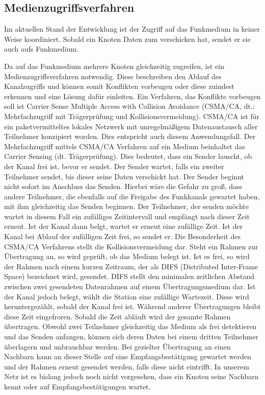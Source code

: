 \documentclass{IEEEtran}
\begin{document}
    \subsection{Medienzugriffsverfahren}
    Im aktuellen Stand der Entwicklung ist der Zugriff auf das Funkmedium in 
    keiner Weise koordiniert. Sobald ein Knoten Daten zum verschicken hat, 
    sendet er sie auch aufs Funkmedium. 

    Da auf das Funkmedium mehrere Knoten gleichzeitig zugreifen, ist ein 
    Medienzugriffsverfahren notwendig. Diese beschreiben den Ablauf des 
    Kanalzugriffs und können somit Konflikten vorbeugen oder diese zuindest 
    erkennen und eine Lösung dafür einleiten. Ein Verfahren, das Konflikte 
    vorbeugen soll ist Carrier Sense Multiple Access with Collision Avoidance 
    (CSMA/CA, dt.: Mehrfachzugriff mit Trägerprüfung und Kollisionsvermeidung). 
    CSMA/CA ist für ein paketvermitteltes lokales Netzwerk mit unregelmäßigem 
    Datenaustausch aller Teilnehmer konzipiert worden. Dies entspricht auch 
    diesem Anwendungsfall.
    Der Mehrfachzugriff mittels CSMA/CA Verfahren auf ein Medium beinhaltet das 
    Carrier Sensing (dt. Trägerprüfung). Dies bedeutet, dass ein Sender lauscht, 
    ob der Kanal frei ist, bevor er sendet. Der Sender wartet, falls ein zweiter 
    Teilnehmer sendet, bis dieser seine Daten verschickt hat. Der Sender beginnt 
    nicht sofort im Anschluss das Senden. Hierbei wäre die Gefahr zu groß, dass 
    andere Teilnehmer, die ebenfalls auf die Freigabe des Funkkanals gewartet 
    haben, mit ihm gleichzeitig das Senden beginnen. Der Teilnehmer, der senden 
    möchte wartet in diesem Fall ein zufälliges Zeitintervall und empfängt nach 
    dieser Zeit erneut. Ist der Kanal dann belgt, wartet er erneut eine 
    zufällige Zeit. Ist der Kanal bei Ablauf der zufälligen Zeit frei, so sendet 
    er.
    Die Besonderheit des CSMA/CA Verfahrens stellt die Kollisionsvermeidung dar. 
    Steht ein Rahmen zur Übertragung an, so wird geprüft, ob das Medium belegt 
    ist. Ist es frei, so wird der Rahmen nach einem kurzen Zeitraum, der als 
    DIFS (Distributed Inter-Frame Space) bezeichnet wird, gesendet. DIFS stellt 
    den minimalen zeitlichen Abstand zwischen zwei gesendeten Datenrahmen auf 
    einem Übertragungsmedium dar. Ist der Kanal jedoch belegt, wählt die Station 
    eine zufällige Wartezeit. Diese wird heruntergezählt, sobald der Kanal frei 
    ist. Während anderer Übertragungen bleibt diese Zeit eingefroren. Sobald die 
    Zeit abläuft wird der gesamte Rahmen übertragen. 
    Obwohl zwei Teilnehmer gleichzeitig das Medium als frei detektieren und das 
    Senden anfangen, können sich deren Daten bei einem dritten Teilnehmer 
    überlagern und unbrauchbar werden. Bei gezielter Übertragung an einen 
    Nachbarn kann an dieser Stelle auf eine Empfangsbestätigung gewartet werden 
    und der Rahmen erneut gesendet werden, falls diese nicht eintrifft. In 
    unserem Netz ist es bislang jedoch noch nicht vorgesehen, dass ein Knoten 
    seine Nachbarn kennt oder auf Empfangsbestätigungen wartet. 
\end{document}
